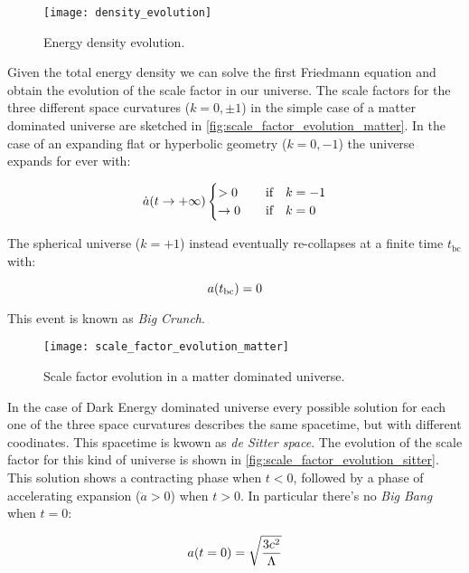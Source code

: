 \begin{figure}
        \centering
        \texttt{[image: density\_evolution]}
        \caption{Energy density evolution.}
        \label{fig:density_evolution}
\end{figure}

Given the total energy density we can solve the first Friedmann equation
and obtain the evolution of the scale factor in our universe. The scale
factors for the three different space curvatures ($k = 0,\pm 1$) in the
simple case of a matter dominated universe are sketched in 
\autoref{fig:scale_factor_evolution_matter}. In the case of an expanding
flat or hyperbolic geometry ($k = 0,-1$) the universe expands for ever with:

\begin{equation}
        \dot a\qty(t \rightarrow +\infty)
                \begin{cases}
                        > 0 & \qif k = -1 \\
                        \rightarrow 0 & \qif k = 0
                \end{cases}
\end{equation}

The spherical universe ($k = +1$) instead eventually re-collapses at a finite
time $t_{\text{bc}}$ with:

\begin{equation}
        a\qty(t_{\text{bc}}) = 0 
\end{equation}

This event is known as \emph{Big Crunch}.

\begin{figure}
        \centering
        \texttt{[image: scale\_factor\_evolution\_matter]}
        \caption{Scale factor evolution in a matter dominated universe.}
        \label{fig:scale_factor_evolution_matter}
\end{figure}

In the case of Dark Energy dominated universe every possible solution for
each one of the three space curvatures describes the same spacetime, but with
different coodinates. This spacetime is kwown as \emph{de Sitter space}.
The evolution of the scale factor for this kind of universe is shown in
\autoref{fig:scale_factor_evolution_sitter}. This solution shows a
contracting phase when $t < 0$, followed by a phase of accelerating
expansion ($\ddot a > 0$) when $t > 0$. In particular there's no
\emph{Big Bang} when $t = 0$:

\begin{equation}
        a\qty(t = 0) = \sqrt{\frac{3c^2}{\Lambda}} 
\end{equation}

